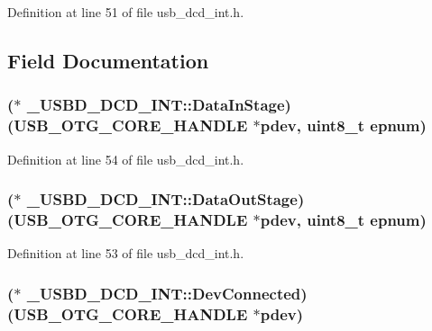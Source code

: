 Definition at line 51 of file usb\-\_\-dcd\-\_\-int.\-h.



\subsection{Field Documentation}
\hypertarget{struct___u_s_b_d___d_c_d___i_n_t_ac85090b851434424a4c5a06d483c11bb}{
\subsubsection[{Data\-In\-Stage}]{($\ast$  \-\_\-\-U\-S\-B\-D\-\_\-\-D\-C\-D\-\_\-\-I\-N\-T\-::\-Data\-In\-Stage)({\bf U\-S\-B\-\_\-\-O\-T\-G\-\_\-\-C\-O\-R\-E\-\_\-\-H\-A\-N\-D\-L\-E} $\ast$pdev, {\bf uint8\-\_\-t} epnum)}}\label{struct___u_s_b_d___d_c_d___i_n_t_ac85090b851434424a4c5a06d483c11bb}


Definition at line 54 of file usb\-\_\-dcd\-\_\-int.\-h.

\hypertarget{struct___u_s_b_d___d_c_d___i_n_t_a74469828d056fc88273b238f0651160b}{
\subsubsection[{Data\-Out\-Stage}]{($\ast$  \-\_\-\-U\-S\-B\-D\-\_\-\-D\-C\-D\-\_\-\-I\-N\-T\-::\-Data\-Out\-Stage)({\bf U\-S\-B\-\_\-\-O\-T\-G\-\_\-\-C\-O\-R\-E\-\_\-\-H\-A\-N\-D\-L\-E} $\ast$pdev, {\bf uint8\-\_\-t} epnum)}}\label{struct___u_s_b_d___d_c_d___i_n_t_a74469828d056fc88273b238f0651160b}


Definition at line 53 of file usb\-\_\-dcd\-\_\-int.\-h.

\hypertarget{struct___u_s_b_d___d_c_d___i_n_t_acab02c3f3debf5ae228a0894804b5df5}{
\subsubsection[{Dev\-Connected}]{($\ast$  \-\_\-\-U\-S\-B\-D\-\_\-\-D\-C\-D\-\_\-\-I\-N\-T\-::\-Dev\-Connected)({\bf U\-S\-B\-\_\-\-O\-T\-G\-\_\-\-C\-O\-R\-E\-\_\-\-H\-A\-N\-D\-L\-E} $\ast$pdev)}}\label{struct___u_s_b_d___d_c_d___i_n_t_acab02c3f3debf5ae228a0894804b5df5}


